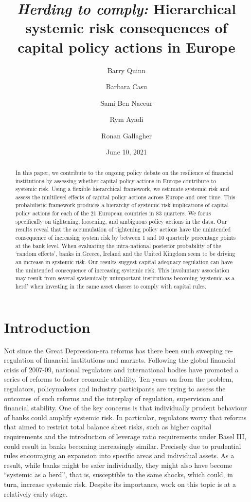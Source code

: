 \documentclass[
  10pt,
]{article}
\title{\emph{Herding to comply:} Hierarchical systemic risk consequences of
capital policy actions in Europe}
\author{Barry Quinn \and Barbara Casu \and Sami Ben Naceur \and Rym Ayadi \and Ronan Gallagher}
\date{June 10, 2021}
\begin{document}
\maketitle
\begin{abstract}
In this paper, we contribute to the ongoing policy debate on the
resilience of financial institutions by assessing whether capital policy
actions in Europe contribute to systemic risk. Using a flexible
hierarchical framework, we estimate systemic risk and assess the
multilevel effects of capital policy actions across Europe and over
time. This probabilistic framework produces a hierarchy of systemic risk
implications of capital policy actions for each of the 21 European
countries in 83 quarters. We focus specifically on tightening,
loosening, and ambiguous policy actions in the data. Our results reveal
that the accumulation of tightening policy actions have the unintended
consequence of increasing system risk by between 1 and 10 quarterly
percentage points at the bank level. When evaluating the intra-national
posterior probability of the `random effects', banks in Greece, Ireland
and the United Kingdom seem to be driving an increase in systemic risk.
Our results suggest capital adequacy regulation can have the unintended
consequence of increasing systemic risk. This involuntary association
may result from several systemically unimportant institutions becoming
`systemic as a herd' when investing in the same asset classes to comply
with capital rules.
\end{abstract}

\hypertarget{introduction}{%
\section{Introduction}\label{introduction}}

Not since the Great Depression-era reforms has there been such sweeping
re-regulation of financial institutions and markets. Following the
global financial crisis of 2007-09, national regulators and
international bodies have promoted a series of reforms to foster
economic stability. Ten years on from the problem, regulators,
policymakers and industry participants are trying to assess the outcomes
of such reforms and the interplay of regulation, supervision and
financial stability. One of the key concerns is that individually
prudent behaviour of banks could amplify systemic risk. In particular,
regulators worry that reforms that aimed to restrict total balance sheet
risks, such as higher capital requirements and the introduction of
leverage ratio requirements under Basel III, could result in banks
becoming increasingly similar. Precisely due to prudential rules
encouraging an expansion into specific areas and individual assets. As a
result, while banks might be safer individually, they might also have
become ``systemic as a herd'', that is, susceptible to the same shocks,
which could, in turn, increase systemic risk. Despite its importance,
work on this topic is at a relatively early stage.
\end{document}
